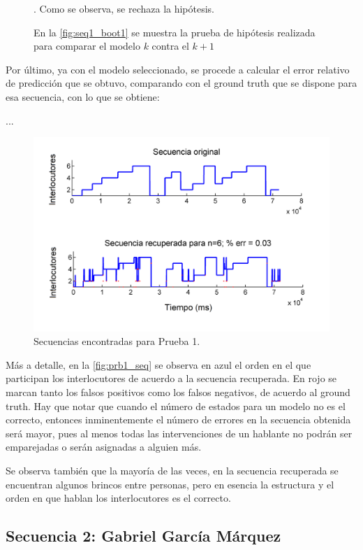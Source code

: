 \begin{figure}[H]
{\begin{subfigure}[b]{0.7\textwidth}
      \caption{}
      \label{fig:seq1_boot1}
    \end{subfigure}
  }
  \caption{En la \autoref{fig:seq1_boot1} se muestra la prueba de hipótesis realizada para comparar el modelo $k$ contra el $k+1$}. Como se observa, se rechaza la hipótesis. 
  \label{fig:seq1_boot}
\end{figure}

Por último, ya con el modelo seleccionado, se procede a calcular el error relativo de predicción que se obtuvo, comparando con el ground truth que se dispone para esa secuencia, con lo que se obtiene: 

...

\begin{figure}[H]
  \centerline
  {\includegraphics[width=0.8\linewidth]{gfx/chap6/cuervo1_}} \quad
  \caption{Secuencias encontradas para Prueba 1.}
  \label{fig:prb1_seq}
\end{figure}

Más a detalle, en la \autoref{fig:prb1_seq} se observa en azul el orden en el que participan los interlocutores de acuerdo a la secuencia recuperada. En rojo se marcan tanto los falsos positivos como los falsos negativos, de acuerdo al ground truth. Hay que notar que cuando el número de estados para un modelo no es el correcto, entonces inminentemente el número de errores en la secuencia obtenida será mayor, pues al menos todas las intervenciones de un hablante no podrán ser emparejadas o serán asignadas a alguien más.

Se observa también que la mayoría de las veces, en la secuencia recuperada se encuentran algunos brincos entre personas, pero en esencia la estructura y el orden en que hablan los interlocutores es el correcto.

\newpage
\subsection{Secuencia 2: Gabriel García Márquez}

